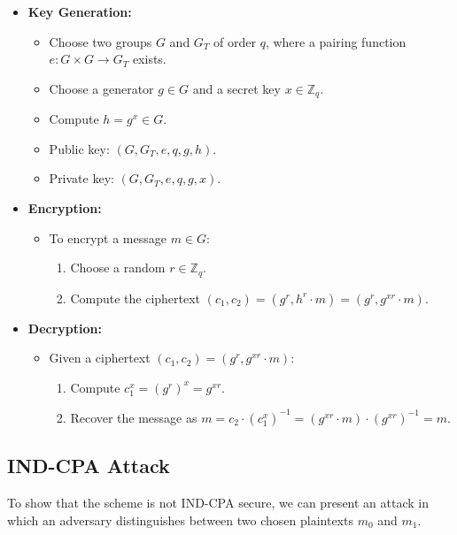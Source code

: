 \documentclass[12pt]{article}
\begin{document}
\begin{itemize}
    \item \textbf{Key Generation:}
    \begin{itemize}
        \item Choose two groups \( G \) and \( G_T \) of order \( q \), where a pairing function \( e: G \times G \rightarrow G_T \) exists.
        \item Choose a generator \( g \in G \) and a secret key \( x \in \mathbb{Z}_q \).
        \item Compute \( h = g^x \in G \).
        \item Public key: \( (G, G_T, e, q, g, h) \).
        \item Private key: \( (G, G_T, e, q, g, x) \).
    \end{itemize}

    \item \textbf{Encryption:}
    \begin{itemize}
        \item To encrypt a message \( m \in G \):
        \begin{enumerate}
            \item Choose a random \( r \in \mathbb{Z}_q \).
            \item Compute the ciphertext \( (c_1, c_2) = (g^r, h^r \cdot m) = (g^r, g^{xr} \cdot m) \).
        \end{enumerate}
    \end{itemize}

    \item \textbf{Decryption:}
    \begin{itemize}
        \item Given a ciphertext \( (c_1, c_2) = (g^r, g^{xr} \cdot m) \):
        \begin{enumerate}
            \item Compute \( c_1^x = (g^r)^x = g^{xr} \).
            \item Recover the message as \( m = c_2 \cdot (c_1^x)^{-1} = (g^{xr} \cdot m) \cdot (g^{xr})^{-1} = m \).
        \end{enumerate}
    \end{itemize}
\end{itemize}

\subsection{IND-CPA Attack}

To show that the scheme is not IND-CPA secure, we can present an attack in which an adversary distinguishes between two chosen plaintexts \( m_0 \) and \( m_1 \).
\end{document}
